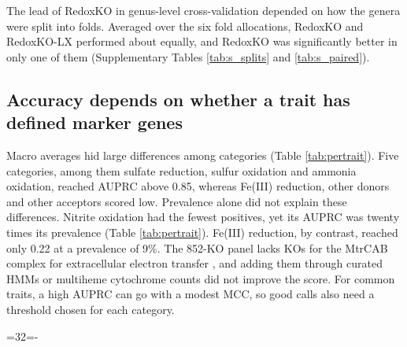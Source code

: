 \documentclass[10pt,a4paper,onecolumn]{article}
\begin{document}
The lead of RedoxKO in genus-level cross-validation depended on how the
genera were split into folds. Averaged over the six fold allocations,
RedoxKO and RedoxKO-LX performed about equally, and RedoxKO was
significantly better in only one of them (Supplementary Tables
\ref{tab:s_splits} and \ref{tab:s_paired}).

\subsection{Accuracy depends on whether a trait has defined marker
genes}\label{accuracy-depends-on-whether-a-trait-has-defined-marker-genes}

Macro averages hid large differences among categories (Table
\ref{tab:pertrait}). Five categories, among them sulfate reduction,
sulfur oxidation and ammonia oxidation, reached AUPRC above 0.85,
whereas Fe(III) reduction, other donors and other acceptors scored low.
Prevalence alone did not explain these differences. Nitrite oxidation
had the fewest positives, yet its AUPRC was twenty times its prevalence
(Table \ref{tab:pertrait}). Fe(III) reduction, by contrast, reached only
0.22 at a prevalence of 9\%. The 852-KO panel lacks KOs for the MtrCAB
complex for extracellular electron transfer \autocite{Shi2016}, and
adding them through curated HMMs or multiheme cytochrome counts did not
improve the score. For common traits, a high AUPRC can go with a modest
MCC, so good calls also need a threshold chosen for each category.

\par

\begingroup{}=32\baselineskip{}=\pagegoal\advance{}-\pagetotal\ifdim\dimen0>\dimen2\ifdim\dimen2>0pt\vfil\fi{}\fi\endgroup

\begingroup\small{}\renewcommand{\arraystretch}{1.25}
\end{document}
